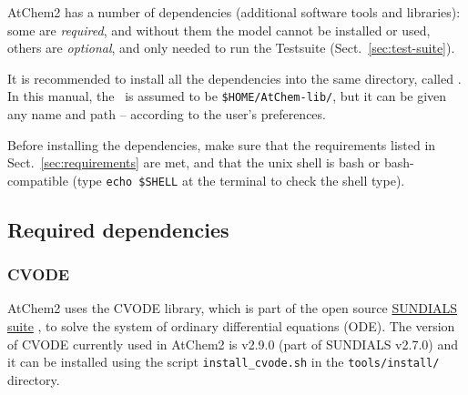 AtChem2 has a number of dependencies (additional software tools and
libraries): some are \emph{required}, and without them the model
cannot be installed or used, others are \emph{optional}, and only
needed to run the Testsuite (Sect.~\ref{sec:test-suite}).

It is recommended to install all the dependencies into the same
directory, called \depdir. In this manual, the \depdir\ is assumed to
be \texttt{\$HOME/AtChem-lib/}, but it can be given any name and path
-- according to the user's preferences.

Before installing the dependencies, make sure that the requirements
listed in Sect.~\ref{sec:requirements} are met, and that the unix
shell is bash or bash-compatible (type \verb|echo $SHELL| at the
terminal to check the shell type).

\subsection{Required dependencies} \label{subsec:required-dependencies}



\subsubsection{CVODE}

AtChem2 uses the CVODE library, which is part of the open source
\href{https://computing.llnl.gov/projects/sundials}{SUNDIALS suite}
\citep{hindmarsh_2005}, to solve the system of ordinary differential
equations (ODE). The version of CVODE currently used in AtChem2 is
v2.9.0 (part of SUNDIALS v2.7.0) and it can be installed using the
script \texttt{install\_cvode.sh} in the \texttt{tools/install/}
directory.

